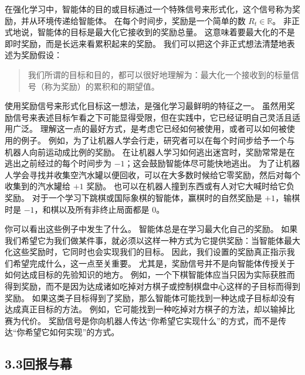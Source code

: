 \documentclass[UTF8, 12pt, fontset=fandol, oneside]{ctexart}
\begin{document}
在强化学习中，智能体的目的或目标通过一个特殊信号来形式化，这个信号称为奖励，并从环境传递给智能体。
在每个时间步，奖励是一个简单的数 $R_t\in\mathbb{R}$。
非正式地说，智能体的目标是最大化它接收到的奖励总量。
这意味着要最大化的不是即时奖励，而是长远来看累积起来的奖励。
我们可以把这个非正式想法清楚地表述为奖励假设：

\begin{quote}
我们所谓的目标和目的，都可以很好地理解为：最大化一个接收到的标量信号（称为奖励）的累积和的期望值。
\end{quote}

使用奖励信号来形式化目标这一想法，是强化学习最鲜明的特征之一。
虽然用奖励信号来表述目标乍看之下可能显得受限，但在实践中，它已经证明自己灵活且适用广泛。
理解这一点的最好方式，是考虑它已经如何被使用，或者可以如何被使用的例子。
例如，为了让机器人学会行走，研究者可以在每个时间步给予一个与机器人向前运动成比例的奖励。
在让机器人学习如何逃出迷宫时，奖励常常是在逃出之前经过的每个时间步为 $-1$；这会鼓励智能体尽可能快地逃出。
为了让机器人学会寻找并收集空汽水罐以便回收，可以在大多数时候给它零奖励，然后对每个收集到的汽水罐给 $+1$ 奖励。
也可以在机器人撞到东西或有人对它大喊时给它负奖励。
对于一个学习下跳棋或国际象棋的智能体，赢棋时的自然奖励是 $+1$，输棋时是 $-1$，和棋以及所有非终止局面都是 $0$。

你可以看出这些例子中发生了什么。
智能体总是在学习最大化自己的奖励。
如果我们希望它为我们做某件事，就必须以这样一种方式为它提供奖励：当智能体最大化这些奖励时，它同时也会实现我们的目标。
因此，我们设置的奖励真正指示我们希望完成什么，这一点至关重要。
尤其是，奖励信号并不是向智能体传授关于如何达成目标的先验知识的地方。
例如，一个下棋智能体应当只因为实际获胜而得到奖励，而不是因为达成诸如吃掉对方棋子或控制棋盘中心这样的子目标而得到奖励。
如果这类子目标得到了奖励，那么智能体可能找到一种达成子目标却没有达成真正目标的方法。
例如，它可能找到一种吃掉对方棋子的方法，却以输掉比赛为代价。
奖励信号是你向机器人传达“你希望它实现什么”的方式，而不是传达“你希望它如何实现”的方式。

\subsection*{3.3\quad 回报与幕}
\end{document}
